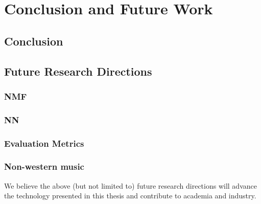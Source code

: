 \chapter{Conclusion and Future Work}
\label{ch:concl}

\section{Conclusion}

\lipsum[1-3]

\section{Future Research Directions}

\lipsum[4]

\subsection{NMF}

\lipsum[5]

\subsection{NN}

\lipsum[6]

\subsection{Evaluation Metrics}

\lipsum[7]

\subsection{Non-western music}

\lipsum[8]

\vspace{2em}
We believe the above (but not limited to) future research directions will
advance the technology presented in this thesis and contribute to academia and
industry.
